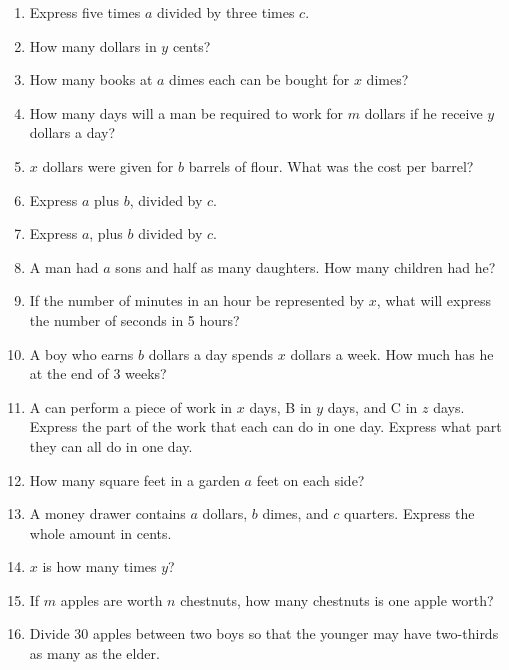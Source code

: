 \documentclass{book}
\begin{document}
\begin{enumerate}
\item Express five times $a$ divided by three times $c$.

\item How many dollars in $y$ cents?

\item How many books at $a$ dimes each can be bought for $x$
dimes?

\item How many days will a man be required to work for $m$ dollars
if he receive $y$ dollars a day?

\item $x$ dollars were given for $b$ barrels of flour. What was
the cost per barrel?

\item Express $a$ plus $b$, divided by $c$.

\item Express $a$, plus $b$ divided by $c$.

\item A man had $a$ sons and half as many daughters. How many
children had he?

\item If the number of minutes in an hour be represented by $x$,
what will express the number of seconds in 5 hours?

\item A boy who earns $b$ dollars a day spends $x$ dollars a week.
How much has he at the end of 3 weeks?

\item A can perform a piece of work in $x$ days, B in $y$ days,
and C in $z$ days. Express the part of the work that each can do
in one day. Express what part they can all do in one day.

\item How many square feet in a garden $a$ feet on each side?

\item A money drawer contains $a$ dollars, $b$ dimes, and $c$
quarters. Express the whole amount in cents.

\item $x$ is how many times $y$?

\item If $m$ apples are worth $n$ chestnuts, how many chestnuts is
one apple worth?

\item Divide 30 apples between two boys so that the younger may
have two-thirds as many as the elder.
\end{enumerate}
\end{document}
